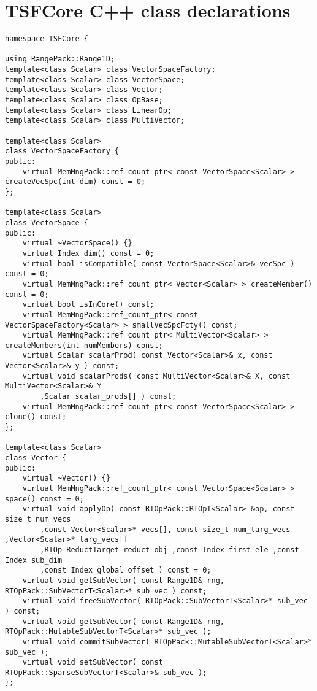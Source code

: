 %
\section{TSFCore C++ class declarations}
\label{app:tsfcore_classes}
%

{\scriptsize\begin{verbatim}
namespace TSFCore {

using RangePack::Range1D;
template<class Scalar> class VectorSpaceFactory;
template<class Scalar> class VectorSpace;
template<class Scalar> class Vector;
template<class Scalar> class OpBase;
template<class Scalar> class LinearOp;
template<class Scalar> class MultiVector;

template<class Scalar>
class VectorSpaceFactory {
public:
    virtual MemMngPack::ref_count_ptr< const VectorSpace<Scalar> > createVecSpc(int dim) const = 0;
};

template<class Scalar>
class VectorSpace {
public:
    virtual ~VectorSpace() {}
    virtual Index dim() const = 0;
    virtual bool isCompatible( const VectorSpace<Scalar>& vecSpc ) const = 0;
    virtual MemMngPack::ref_count_ptr< Vector<Scalar> > createMember() const = 0;
    virtual bool isInCore() const;
    virtual MemMngPack::ref_count_ptr< const VectorSpaceFactory<Scalar> > smallVecSpcFcty() const;
    virtual MemMngPack::ref_count_ptr< MultiVector<Scalar> > createMembers(int numMembers) const;
    virtual Scalar scalarProd( const Vector<Scalar>& x, const Vector<Scalar>& y ) const;
    virtual void scalarProds( const MultiVector<Scalar>& X, const MultiVector<Scalar>& Y
        ,Scalar scalar_prods[] ) const;
    virtual MemMngPack::ref_count_ptr< const VectorSpace<Scalar> > clone() const;
};

template<class Scalar>
class Vector {
public:
    virtual ~Vector() {}
    virtual MemMngPack::ref_count_ptr< const VectorSpace<Scalar> > space() const = 0;
    virtual void applyOp( const RTOpPack::RTOpT<Scalar> &op, const size_t num_vecs
        ,const Vector<Scalar>* vecs[], const size_t num_targ_vecs ,Vector<Scalar>* targ_vecs[]
        ,RTOp_ReductTarget reduct_obj ,const Index first_ele ,const Index sub_dim
        ,const Index global_offset ) const = 0;
    virtual void getSubVector( const Range1D& rng, RTOpPack::SubVectorT<Scalar>* sub_vec ) const;
    virtual void freeSubVector( RTOpPack::SubVectorT<Scalar>* sub_vec ) const;
    virtual void getSubVector( const Range1D& rng, RTOpPack::MutableSubVectorT<Scalar>* sub_vec );
    virtual void commitSubVector( RTOpPack::MutableSubVectorT<Scalar>* sub_vec );
    virtual void setSubVector( const RTOpPack::SparseSubVectorT<Scalar>& sub_vec );
};


\end{verbatim}}
